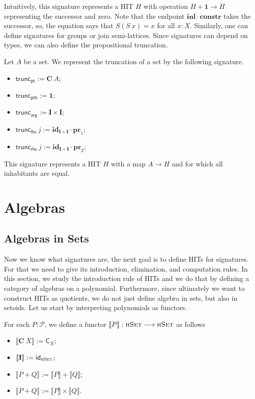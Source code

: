 \documentclass[9pt]{entcs}
\newcommand{\type}[1]{\textsc{#1}}
\newcommand{\constructor}[1]{\mathbf{#1}}
\newcommand{\functortxt}[1]{\mathsf{#1}}
\newcommand{\function}[1]{\mathsf{#1}}
\newcommand{\hset}{\type{hSet}} %
\newcommand{\0}{\textbf{0}} %
\newcommand{\1}{\textbf{1}} %
\newcommand{\Def}{:=} %
\newcommand{\functor}[2]{#1 \longrightarrow #2} %
\newcommand{\idf}[1]{\functortxt{id}_{#1}} %
\newcommand{\Cf}[1]{\functortxt{C}_{#1}} %
\newcommand{\prodf}[2]{#1 \times #2} %
\newcommand{\sumf}[2]{#1 + #2} %
\newcommand{\poly}{\mathcal{P}} %
\newcommand{\C}{\constructor{C}} %
\newcommand{\I}{\constructor{I}} %
\newcommand{\sumP}[2]{#1 + #2} %
\newcommand{\prodP}[2]{#1 \times #2} %
\newcommand{\id}[1]{\constructor{id}_{#1}} %
\newcommand{\comp}[2]{#1 \cdot #2} %
\newcommand{\inle}{\constructor{inl}} %
\newcommand{\prle}{\constructor{pr}_1} %
\newcommand{\prre}{\constructor{pr}_2} %
\newcommand{\constr}{\constructor{constr}} %
\newcommand{\pt}[0]{\textsf{pt}}
\newcommand{\pthI}[0]{\textsf{pth}}
\newcommand{\pthA}[0]{\textsf{arg}}
\newcommand{\pthlh}[0]{\textsf{lhs}}
\newcommand{\pthrh}[0]{\textsf{rhs}}
\newcommand{\pointc}[1]{#1_{\pt}} %
\newcommand{\pathI}[1]{#1_{\pthI}} %
\newcommand{\pathA}[1]{#1_{\pthA}} %
\newcommand{\pathlh}[1]{#1_{\pthlh}} %
\newcommand{\pathrh}[1]{#1_{\pthrh}} %
\newcommand{\trunc}{\function{trunc}} %
\newcommand{\semP}[1]{\llbracket #1 \rrbracket} %
\begin{document}
Intuitively, this signature represents a HIT $H$ with operation $H + \1 \rightarrow H$ representing the successor and zero.
Note that the endpoint $\comp{\inle}{\constr}$ takes the successor, so, the equation says that $S(S \> x) = x$ for all $x : X$.
Similarly, one can define signatures for groups or join semi-lattices.
Since signatures can depend on types, we can also define the propositional truncation.

\begin{example}
\label{ex:truncsig}
Let $A$ be a set.
We represent the truncation of a set by the following signature.
\begin{itemize}
	\item $\pointc{\trunc} \Def \C \> A$;
	\item $\pathI{\trunc} \Def \1$;
	\item $\pathA{\trunc} \Def \prodP{\I}{\I}$;
	\item $\pathlh{\trunc} \> j \Def \comp{\id{\prodP{\I}{\I}}}{\prle}$;
	\item $\pathrh{\trunc} \> j \Def \comp{\id{\prodP{\I}{\I}}}{\prre}$;
\end{itemize}
\end{example}
This signature represents a HIT $H$ with a map $A \rightarrow H$ and for which all inhabitants are equal. 

\section{Algebras}
\label{sec:algebras}

\subsection{Algebras in Sets}
Now we know what signatures are, the next goal is to define HITs for signatures.
For that we need to give its introduction, elimination, and computation rules.
In this section, we study the introduction rule of HITs and we do that by defining a category of algebras on a polynomial.
Furthermore, since ultimately we want to construct HITs as quotients, we do not just define algebra in sets, but also in setoids.
Let us start by interpreting polynomials as functors.

\begin{definition}
\label{def:sempoly}
For each $P : \poly$, we define a functor $\semP{P} : \functor{\hset}{\hset}$ as follows
\begin{itemize}
	\item $\semP{\C \> X} \Def \Cf{X}$;
	\item $\semP{\I} \Def \idf{\hset}$;
	\item $\semP{\sumP{P}{Q}} \Def \sumf{\semP{P}}{\semP{Q}}$;
	\item $\semP{\sumP{P}{Q}} \Def \prodf{\semP{P}}{\semP{Q}}$.
\end{itemize}
\end{definition}
\end{document}
